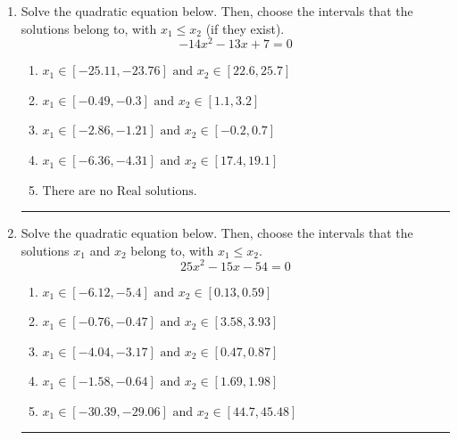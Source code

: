 \documentclass[14pt]{extbook}
\newcommand{\litem}[1]{\item#1\hspace*{-1cm}\rule{\textwidth}{0.4pt}}
\begin{document}
\begin{enumerate}
\litem{
Solve the quadratic equation below. Then, choose the intervals that the solutions belong to, with $x_1 \leq x_2$ (if they exist).\[ -14x^{2} -13 x + 7 = 0 \]\begin{enumerate}[label=\Alph*.]
\item \( x_1 \in [-25.11, -23.76] \text{ and } x_2 \in [22.6, 25.7] \)
\item \( x_1 \in [-0.49, -0.3] \text{ and } x_2 \in [1.1, 3.2] \)
\item \( x_1 \in [-2.86, -1.21] \text{ and } x_2 \in [-0.2, 0.7] \)
\item \( x_1 \in [-6.36, -4.31] \text{ and } x_2 \in [17.4, 19.1] \)
\item \( \text{There are no Real solutions.} \)

\end{enumerate} }
\litem{
Solve the quadratic equation below. Then, choose the intervals that the solutions $x_1$ and $x_2$ belong to, with $x_1 \leq x_2$.\[ 25x^{2} -15 x -54 = 0 \]\begin{enumerate}[label=\Alph*.]
\item \( x_1 \in [-6.12, -5.4] \text{ and } x_2 \in [0.13, 0.59] \)
\item \( x_1 \in [-0.76, -0.47] \text{ and } x_2 \in [3.58, 3.93] \)
\item \( x_1 \in [-4.04, -3.17] \text{ and } x_2 \in [0.47, 0.87] \)
\item \( x_1 \in [-1.58, -0.64] \text{ and } x_2 \in [1.69, 1.98] \)
\item \( x_1 \in [-30.39, -29.06] \text{ and } x_2 \in [44.7, 45.48] \)


\end{enumerate}}
\end{enumerate}
\end{document}
